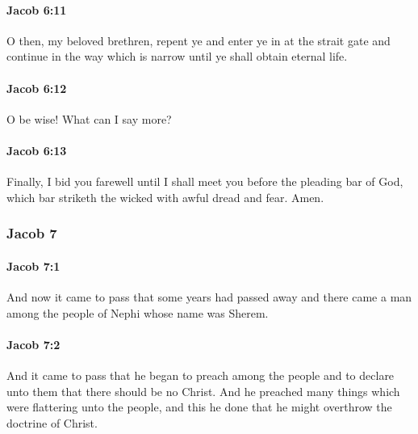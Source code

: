 		\paragraph{Jacob 6:11} %
			\label{JACOB-6-11}

			O then, my beloved brethren, repent ye
			and enter ye in at the strait gate
			and continue in the way which is narrow
			until ye shall obtain eternal life.

		\paragraph{Jacob 6:12} %
			\label{JACOB-6-12}

			O be wise!
			What can I say more?

		\paragraph{Jacob 6:13} %
			\label{JACOB-6-13}

			Finally, I bid you farewell
			until I shall meet you before the pleading bar of God,
			which bar striketh the wicked with awful dread and fear.
			Amen.

	\subsubsection{Jacob 7} %
		\label{JACOB-7}
		
		\paragraph{Jacob 7:1} %
			\label{JACOB-7-1}

			And now it came to pass that some years had passed away
			and there came a man among the people of Nephi whose name was Sherem.

		\paragraph{Jacob 7:2} %
			\label{JACOB-7-2}

			And it came to pass that he began to preach among the people
			and to declare unto them that there should be no Christ.
			And he preached many things which were flattering unto the people,
			and this he done that he might overthrow the doctrine of Christ.

